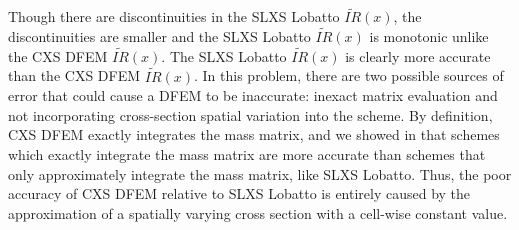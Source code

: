 Though there are discontinuities in the SLXS Lobatto $\widetilde{IR}(x)$, the discontinuities are smaller and the SLXS Lobatto $\widetilde{IR}(x)$ is monotonic unlike the CXS DFEM $\widetilde{IR}(x)$.   
The SLXS Lobatto $\widetilde{IR}(x)$ is clearly more accurate than the CXS DFEM $\widetilde{IR}(x)$.
%
%
In this problem, there are two possible sources of error that could cause a DFEM to be inaccurate: inexact matrix evaluation and not incorporating cross-section spatial variation into the scheme.
By definition, CXS DFEM exactly integrates the mass matrix, and we showed in \cite{part_1_paper} that schemes which exactly integrate the mass matrix are more accurate than schemes that only approximately integrate the mass matrix, like SLXS Lobatto.
Thus, the poor accuracy of CXS DFEM relative to SLXS Lobatto is entirely caused by the approximation of a spatially varying cross section with a cell-wise constant value.


